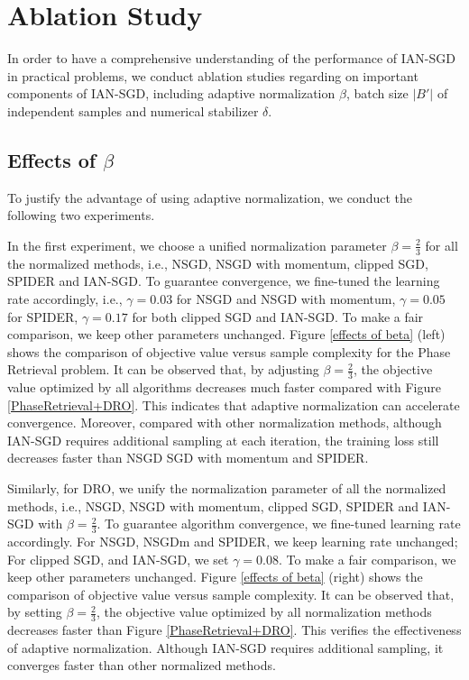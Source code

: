 \documentclass[10pt]{article} %
\begin{document}
\newpage
\section{Ablation Study}\label{sec: ablation study}
In order to have a comprehensive understanding of the performance of IAN-SGD in practical problems, we conduct ablation studies regarding on important components of IAN-SGD, including adaptive normalization $\beta$, batch size $|B'|$ of independent samples and numerical stabilizer $\delta$.

\subsection{\texorpdfstring{Effects of $\beta$}{Effects of beta}}\label{sec: effects of beta}
To justify the advantage of using adaptive normalization, we conduct the following two experiments. 

In the first experiment, we choose a unified normalization parameter $\beta = \frac{2}{3}$ for all the normalized methods, i.e., NSGD, NSGD with momentum, clipped SGD, SPIDER and IAN-SGD. To guarantee convergence, we fine-tuned the learning rate accordingly, i.e., $\gamma = 0.03$ for NSGD and NSGD with momentum, $\gamma = 0.05$ for SPIDER, $\gamma = 0.17$ for both clipped SGD and IAN-SGD. To make a fair comparison, we keep other parameters unchanged. Figure \ref{effects of beta} (left) shows the comparison of objective value versus sample complexity for the Phase Retrieval problem. It can be observed that, by adjusting $\beta = \frac{2}{3}$, the objective value optimized by all algorithms decreases much faster compared with Figure \ref{PhaseRetrieval+DRO}. This indicates that adaptive normalization can accelerate convergence. Moreover, compared with other normalization methods, although IAN-SGD requires additional sampling at each iteration, the training loss still decreases faster than NSGD SGD with momentum and SPIDER. 

Similarly, for DRO, we unify the normalization parameter of all the normalized methods, i.e., NSGD, NSGD with momentum, clipped SGD, SPIDER and IAN-SGD with $\beta = \frac{2}{3}$. To guarantee algorithm convergence, we fine-tuned learning rate accordingly. For NSGD, NSGDm and SPIDER, we keep learning rate unchanged; For clipped SGD, and IAN-SGD, we set $\gamma = 0.08$. To make a fair comparison, we keep other parameters unchanged. Figure \ref{effects of beta} (right) shows the comparison of objective value versus sample complexity. It can be observed that, by setting $\beta = \frac{2}{3}$, the objective value optimized by all normalization methods decreases faster than Figure \ref{PhaseRetrieval+DRO}. This verifies the effectiveness of adaptive normalization.
Although IAN-SGD requires additional sampling, it converges faster than other normalized methods. 
\end{document}
